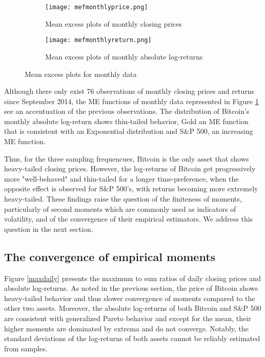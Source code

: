 \documentclass[12pt]{article}
\begin{document}
\begin{figure}[H]
\centering
\begin{subfigure}[b]{\textwidth}
\texttt{[image: mefmonthlyprice.png]}\hfill
\caption{Mean excess plots of monthly closing prices}
\end{subfigure}
\begin{subfigure}[b]{\textwidth}
\texttt{[image: mefmonthlyreturn.png]}\hfill
\caption{Mean excess plots of monthly absolute log-returns}
\end{subfigure}
\caption{Mean excess plots for monthly data}
\label{mefmonthly}
\end{figure}


Although there only exist 76 observations of monthly closing prices and returns since September 2014, the ME functions of monthly data represented in Figure \ref{mefmonthly} see an accentuation of the previous observations. The distribution of Bitcoin's monthly absolute log-return shows thin-tailed behavior, Gold an ME function that is consistent with an Exponential distribution and S\&P 500, an increasing ME function. 

Thus, for the three sampling frequencues, Bitcoin is the only asset that shows heavy-tailed closing prices. However, the log-returns of Bitcoin get progressively more "well-behaved" and thin-tailed for a longer time-preference, when the opposite effect is observed for S\&P 500's, with returns becoming more extremely heavy-tailed. These findings raise the question of the finiteness of moments, particularly of second moments which are commonly used as indicators of volatility, and of the convergence of their empirical estimators. We address this question in the next section.


\subsection{The convergence of empirical moments}
\label{maxi}
Figure \ref{maxdaily} presents the maximum to sum ratios of daily closing prices and absolute log-returns. As noted in the previous section, the price of Bitcoin shows heavy-tailed behavior and thus slower convergence of moments compared to the other two assets. Moreover, the absolute log-returns of both Bitcoin and S\&P 500 are consistent with generalized Pareto behavior and except for the mean, their higher moments are dominated by extrema and do not converge. Notably, the standard deviations of the log-returns of both assets cannot be reliably estimated from samples.
\end{document}

